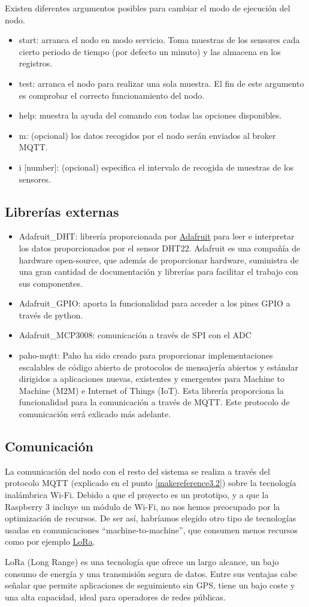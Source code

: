 Existen diferentes argumentos posibles para cambiar el modo de ejecución del nodo.
\begin{itemize}
\item start: arranca el nodo en modo servicio. Toma muestras de los sensores cada cierto periodo de tiempo (por defecto un minuto) y las almacena en los registros.
\item test: arranca el nodo para realizar una sola muestra. El fin de este argumento es comprobar el correcto funcionamiento del nodo.
\item help: muestra la ayuda del comando con todas las opciones disponibles.
\item m: (opcional) los datos recogidos por el nodo serán enviados al broker MQTT.
\item i [number]: (opcional) especifica el intervalo de recogida de muestras de los sensores. 
\end{itemize}

\subsection{Librerías externas}

\begin{itemize}  
\item Adafruit\_DHT: librería proporcionada por \href{https://www.adafruit.com/}{Adafruit} para leer e interpretar los datos proporcionados por el sensor DHT22. Adafruit es una compañía de hardware open-source, que además de proporcionar hardware, suministra de una gran cantidad de documentación y librerías para facilitar el trabajo con sus componentes. 
\item Adafruit\_GPIO: aporta la funcionalidad para acceder a los pines GPIO a través de python.
\item Adafruit\_MCP3008: comunicación a través de SPI con el ADC
\item paho-mqtt: Paho ha sido creado para proporcionar implementaciones escalables de código abierto de protocolos de mensajería abiertos y estándar dirigidos a aplicaciones nuevas, existentes y emergentes para Machine to Machine (M2M) e Internet of Things (IoT). Esta librería proporciona la funcionalidad para la comunicación a través de MQTT. Este protocolo de comunicación será exlicado más adelante.
\end{itemize}

\subsection{Comunicación}
La comunicación del nodo con el resto del sistema se realiza a través del protocolo MQTT (explicado en el punto \ref{makereference3.2}) sobre la tecnología inalámbrica Wi-Fi. Debido a que el proyecto es un prototipo, y a que la Raspberry 3 incluye un módulo de Wi-Fi, no nos hemos preocupado por la optimización de recursos. De ser así, habríamos elegido otro tipo de tecnologías usadas en comunicaciones ``machine-to-machine'', que consumen menos recursos como por ejemplo \href{https://www.lora-alliance.org/What-Is-LoRa/Technology}{LoRa}.

LoRa (Long Range) es una tecnología que ofrece un largo alcance, un bajo consumo de energía y una transmisión segura de datos. Entre sus ventajas cabe señalar que permite aplicaciones de seguimiento sin GPS, tiene un bajo coste y una alta capacidad, ideal para operadores de redes públicas.